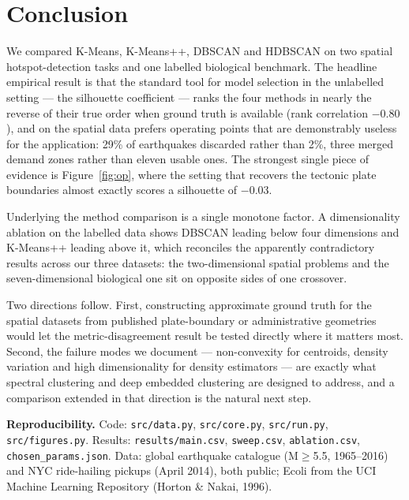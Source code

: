 \documentclass[11pt,a4paper]{article}
\begin{document}
\section{Conclusion}

We compared K-Means, K-Means++, DBSCAN and HDBSCAN on two spatial hotspot-detection
tasks and one labelled biological benchmark. The headline empirical result is
that the standard tool for model selection in the unlabelled setting --- the
silhouette coefficient --- ranks the four methods in nearly the reverse of their
true order when ground truth is available (rank correlation $-0.80$), and on the
spatial data prefers operating points that are demonstrably useless for the
application: 29\% of earthquakes discarded rather than 2\%, three merged demand
zones rather than eleven usable ones. The strongest single piece of evidence is
Figure~\ref{fig:op}, where the setting that recovers the tectonic plate
boundaries almost exactly scores a silhouette of $-0.03$.

Underlying the method comparison is a single monotone factor. A dimensionality
ablation on the labelled data shows DBSCAN leading below four dimensions and
K-Means++ leading above it, which reconciles the apparently contradictory results
across our three datasets: the two-dimensional spatial problems and the
seven-dimensional biological one sit on opposite sides of one crossover.

Two directions follow. First, constructing approximate ground truth for the
spatial datasets from published plate-boundary or administrative geometries would
let the metric-disagreement result be tested directly where it matters most.
Second, the failure modes we document --- non-convexity for centroids, density
variation and high dimensionality for density estimators --- are exactly what
spectral clustering and deep embedded clustering are designed to address, and a
comparison extended in that direction is the natural next step.

\vspace{4pt}\noindent\footnotesize
\textbf{Reproducibility.} Code: \texttt{src/data.py}, \texttt{src/core.py},
\texttt{src/run.py}, \texttt{src/figures.py}. Results: \texttt{results/main.csv},
\texttt{sweep.csv}, \texttt{ablation.csv}, \texttt{chosen\_params.json}.
Data: global earthquake catalogue (M$\geq$5.5, 1965--2016) and NYC ride-hailing
pickups (April 2014), both public; Ecoli from the UCI Machine Learning
Repository (Horton \& Nakai, 1996).
\end{document}
